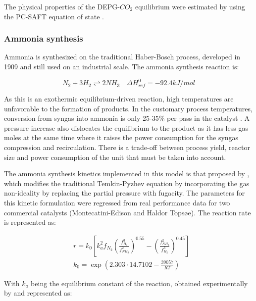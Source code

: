 \documentclass[a4paper, titlepage]{article}
\begin{document}
The physical properties of the DEPG-$CO_2$ equilibrium were estimated by using the PC-SAFT equation of state
\cite{dymentAcidGasCleaning2015}.

\subsubsection{Ammonia synthesis}

Ammonia is synthesized on the traditional Haber-Bosch process, developed in 1909 and still used on an industrial scale.
The ammonia synthesis reaction is:

\begin{equation}
	N_2 + 3H_2 \rightleftharpoons 2NH_3 \quad \Delta H_{ref}^0 = -92.4 kJ/mol
\end{equation}

As this is an exothermic equilibrium-driven reaction, high temperatures are unfavorable to the formation of products.
In the customary process temperatures, conversion from syngas into ammonia is only 25-35\% per pass in the catalyst
\cite{applAmmoniaPrinciplesIndustrial1999}. A pressure increase also dislocates the equilibrium to the product as it 
has less gas moles \cite{sandlerChemicalBiochemicalEngineering2017} at the same time where it raises the power 
consumption for the syngas compression and recirculation. There is a trade-off between process yield, reactor size and 
power consumption of the unit that must be taken into account.

The ammonia synthesis kinetics implemented in this model is that proposed by 
\textcite{singhSimulationAmmoniaSynthesis1979}, which modifies the traditional Temkin-Pyzhev equation 
\cite{temkinKineticsAmmoniaSynthesis1940} by incorporating the gas non-ideality by replacing the partial pressure 
with fugacity. The parameters for this kinetic formulation were regressed from real performance data for two 
commercial catalysts (Montecatini-Edison and Haldor Topsøe). The reaction rate is represented as:

\begin{align}
	&r = k_0 \left[ k_a^2f_{N_2} \left(  \frac{f^3_{H_2}}{f^2_{NH_3}} \right)^{0.55} - \left( \frac{f^2_{NH_3}}{f^3_{H_2}} \right)^{0.45} \right] \\
	&k_0 = \exp \left(2.303 \cdot 14.7102 - \frac{39057}{RT}\right)
\end{align}

With $k_a$ being the equilibrium constant of the reaction, obtained experimentally by 
\textcite{gillespieThermodynamicTreatmentChemical1930} and represented as:
\end{document}
